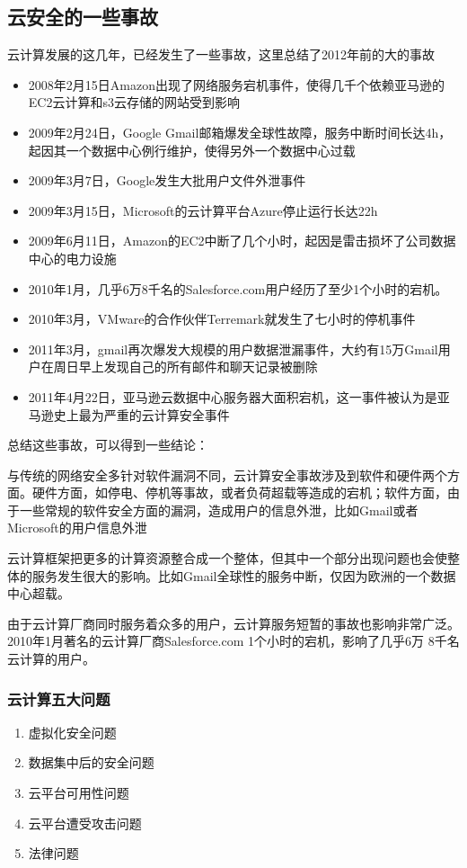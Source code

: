 \documentclass[a4paper]{ctexart}
\begin{document}
    \subsection{云安全的一些事故}
    云计算发展的这几年，已经发生了一些事故，这里总结了2012年前的大的事故
    \begin{itemize}
        \item 2008年2月15日Amazon出现了网络服务宕机事件，使得几千个依赖亚马逊的EC2云计算和s3云存储的网站受到影响
        \item 2009年2月24日，Google Gmail邮箱爆发全球性故障，服务中断时间长达4h，起因其一个数据中心例行维护，使得另外一个数据中心过载
        \item 2009年3月7日，Google发生大批用户文件外泄事件
        \item 2009年3月15日，Microsoft的云计算平台Azure停止运行长达22h
        \item 2009年6月11日，Amazon的EC2中断了几个小时，起因是雷击损坏了公司数据中心的电力设施
        \item 2010年1月，几乎6万8千名的Salesforce.com用户经历了至少1个小时的宕机。
        \item 2010年3月，VMware的合作伙伴Terremark就发生了七小时的停机事件
        \item 2011年3月，gmail再次爆发大规模的用户数据泄漏事件，大约有15万Gmail用户在周日早上发现自己的所有邮件和聊天记录被删除
        \item 2011年4月22日，亚马逊云数据中心服务器大面积宕机，这一事件被认为是亚马逊史上最为严重的云计算安全事件
    \end{itemize}
    {\color{red}
    总结这些事故，可以得到一些结论：
    \par 与传统的网络安全多针对软件漏洞不同，云计算安全事故涉及到软件和硬件两个方面。硬件方面，如停电、停机等事故，或者负荷超载等造成的宕机；软件方面，由于一些常规的软件安全方面的漏洞，造成用户的信息外泄，比如Gmail或者Microsoft的用户信息外泄
    \par 云计算框架把更多的计算资源整合成一个整体，但其中一个部分出现问题也会使整体的服务发生很大的影响。比如Gmail全球性的服务中断，仅因为欧洲的一个数据中心超载。
\par 由于云计算厂商同时服务着众多的用户，云计算服务短暂的事故也影响非常广泛。2010年1月著名的云计算厂商Salesforce.com 1个小时的宕机，影响了几乎6万 8千名云计算的用户。}

    \subsubsection{云计算五大问题}
    \begin{enumerate}
        \item 虚拟化安全问题
        \item 数据集中后的安全问题
        \item 云平台可用性问题
        \item 云平台遭受攻击问题
        \item 法律问题
    \end{enumerate}
\end{document}
